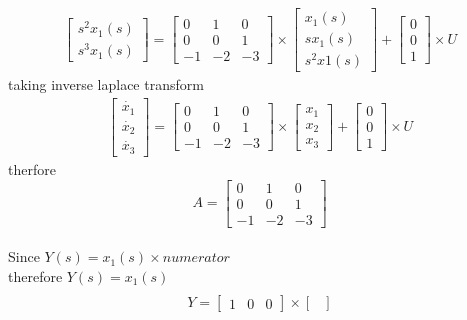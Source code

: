 \begin{enumerate}[label=\thesection.\arabic*.,ref=\thesection.\theenumi]
\begin{gather}
\begin{bmatrix}
s^2x_{1}(s)\\
s^3x_{1}(s)
\end{bmatrix}
=
\begin{bmatrix}
0&1&0\\
0&0&1\\
-1&-2&-3
\end{bmatrix}\times \begin{bmatrix}
x_{1}(s)\\
sx_{1}(s)\\
s^2x{1}(s)
\end{bmatrix}
+
\begin{bmatrix}
0\\
0\\
1
\end{bmatrix} \times U
\end{gather}
taking inverse laplace transform
\begin{gather}
\begin{bmatrix}
\dot{x_{1}}\\
\dot{x_{2}}\\
\dot{x_{3}}
\end{bmatrix}
=
\begin{bmatrix}
0&1&0\\
0&0&1\\
-1&-2&-3
\end{bmatrix}\times \begin{bmatrix}
x_{1}\\
x_{2}\\
x_{3}
\end{bmatrix}
+
\begin{bmatrix}
0\\
0\\
1
\end{bmatrix} \times U
\end{gather}
therfore
\begin{equation}
A=\begin{bmatrix}
0&1&0\\
0&0&1\\
-1&-2&-3
\end{bmatrix}
\end{equation}
\\
Since $ Y(s)=x_{1}(s)\times numerator$
\\therefore $ Y(s)=x_{1}(s) $
\begin{gather}
\\Y=
\begin{bmatrix}
1&0&0
\end{bmatrix}\times \begin{bmatrix}

\end{bmatrix}
\end{gather}
\end{enumerate}
